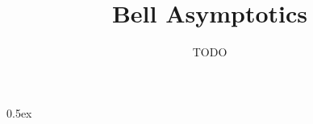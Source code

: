 \documentclass[11pt,a4paper]{article}
\begin{document}
\title{Bell Asymptotics}
\author{TODO}
\maketitle


\tableofcontents

\parindent 0pt\parskip 0.5ex





\end{document}
